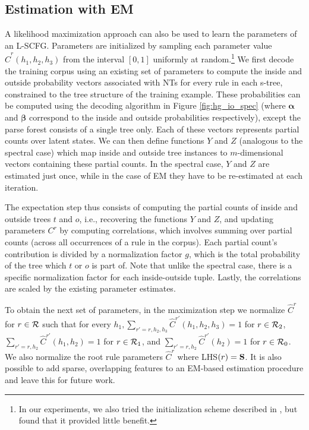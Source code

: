 \documentclass[11pt]{article}
\newcommand{\rules}{{\cal R}}
\newcommand{\e}[1]{\hat{#1}}
\newcommand{\bS}{{\bf S}}
\newcommand{\balpha}{\bm{\alpha}}
\newcommand{\bbeta}{\bm{\beta}}
\begin{document}
\subsection{Estimation with EM}
\label{sec:em}
A likelihood maximization approach can also be used to learn the parameters of an L-SCFG.  
Parameters are initialized by sampling each parameter value $\e{C}^r(h_1, h_2, h_3)$ from the interval $[0,1]$ uniformly at random.\footnote{In our experiments, we also tried the initialization scheme described in , but found that it provided little benefit.}
We first decode the training corpus using an existing set of parameters to compute the inside and outside probability vectors associated with NTs for every rule in each s-tree, constrained to the tree structure of the training example. 
These probabilities can be computed using the decoding algorithm in Figure \ref{fig:hg_io_spec} (where $\balpha$ and $\bbeta$ correspond to the inside and outside probabilities respectively), except the parse forest consists of a single tree only. 
Each of these vectors represents partial counts over latent states.  
We can then define functions $Y$ and $Z$ (analogous to the spectral case) which map inside and outside tree instances to $m$-dimensional vectors containing these partial counts. 
In the spectral case, $Y$ and $Z$ are estimated just once, while in the case of EM they have to be re-estimated at each iteration.

The expectation step thus consists of computing the partial counts of inside and outside trees $t$ and $o$, i.e., recovering the functions $Y$ and $Z$, and updating parameters $C^r$ by computing correlations, which involves summing over partial counts (across all occurrences of a rule in the corpus). 
Each partial count's contribution is divided by a normalization factor $g$, which is the total probability of the tree which $t$ or $o$ is part of.  
Note that unlike the spectral case, there is a specific normalization factor for each inside-outside tuple. 
Lastly, the correlations are scaled by the existing parameter estimates.

To obtain the next set of parameters, in the maximization step we normalize $\e{C}^r$ for $r \in \rules$ such that for every $h_1, \sum_{r'=r,h_2,h_3} \e{C}^{r'}(h_1, h_2, h_3) = 1$ for $r \in \rules_2$, $\sum_{r'=r,h_2} \e{C}^{r'}(h_1, h_2) = 1$ for $r \in \rules_1$, and $\sum_{r'=r,h_2} \e{C}^{r'}(h_2) = 1$ for $r \in \rules_0$.  
We also normalize the root rule parameters $\e{C}^r$ where LHS$(r) = \bS$.  
It is also possible to add sparse, overlapping features to an EM-based estimation procedure \cite{Berg-Kirkpatrick2010} and leave this for future work.  
\end{document}
